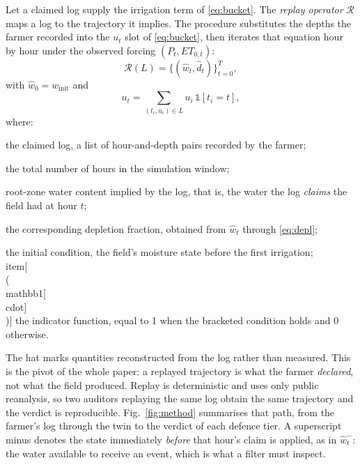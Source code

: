 Let a claimed log supply the irrigation term of \eqref{eq:bucket}. The \emph{replay operator} $\mathcal{R}$ maps a log to the trajectory it implies. The
procedure substitutes the depths the farmer recorded into the $u_t$ slot of
\eqref{eq:bucket}, then iterates that equation hour by hour under the observed
forcing $(P_t,ET_{0,t})$:
\begin{equation}
\mathcal{R}(L)=\{(\hat w_t,\hat d_t)\}_{t=0}^{T},
\label{eq:replay}
\end{equation}
with $\hat w_0=w_{\mathrm{init}}$ and
\begin{equation}
u_t=\sum_{(t_i,u_i)\in L}u_i\,\mathbb{1}[t_i=t],
\label{eq:uterm}
\end{equation}
where:
\begin{symbolist}
\item[$L$] the claimed log, a list of hour-and-depth pairs recorded by the farmer;
\item[$T$] the total number of hours in the simulation window;
\item[$\hat w_t$] root-zone water content implied by the log, that is, the water the
  log \emph{claims} the field had at hour $t$;
\item[$\hat d_t$] the corresponding depletion fraction, obtained from $\hat w_t$
  through \eqref{eq:depl};
\item[$\hat w_0=w_{\mathrm{init}}$] the initial condition, the field's moisture
  state before the first irrigation;
\\item[{\\(\\mathbb{1}[\\cdot]\\)}] the indicator function, equal to 1 when the bracketed condition holds and 0
  otherwise.
\end{symbolist}

The hat marks quantities reconstructed from the log rather than measured. This is the
pivot of the whole paper: a replayed trajectory is what the farmer \emph{declared},
not what the field produced. Replay is
deterministic and uses only public reanalysis, so two auditors replaying the
same log obtain the same trajectory and the verdict is reproducible. Fig.~\ref{fig:method} summarises that path, from the farmer's log through the twin to the verdict of each defence tier. A
superscript minus denotes the state immediately \emph{before} that hour's
claim is applied, as in $\hat w_{t}^{-}$: the water available to receive an
event, which is what a filter must inspect.

